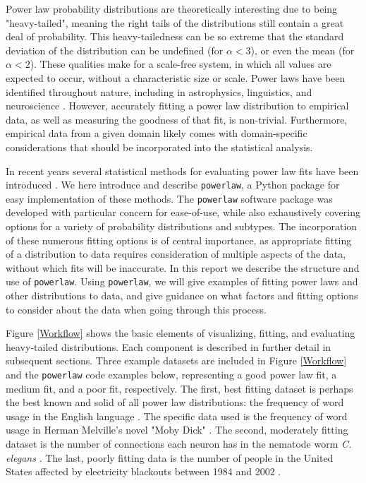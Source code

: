 \documentclass[10pt]{article}
\begin{document}
Power law probability distributions are theoretically interesting due to being  "heavy-tailed", meaning the right tails of the distributions still contain a great deal of probability. This heavy-tailedness can be so extreme that the standard deviation of the distribution can be undefined (for $\alpha<3$), or even the mean (for $\alpha<2$). These qualities make for a scale-free system, in which all values are expected to occur, without a characteristic size or scale. Power laws have been identified throughout nature, including in astrophysics, linguistics, and neuroscience \cite{Michel2011, Zipf1935, Beggs2003, Shriki2013}. However, accurately fitting a power law distribution to empirical data, as well as measuring the goodness of that fit, is non-trivial. Furthermore, empirical data from a given domain likely comes with domain-specific considerations that should be incorporated into the statistical analysis.

In recent years several statistical methods for evaluating power law fits have been introduced \cite{Clauset2009, Klaus2011}. We here introduce and describe \verb$powerlaw$, a Python package for easy implementation of these methods. The \verb$powerlaw$ software package was developed with particular concern for ease-of-use, while also exhaustively covering options for a variety of probability distributions and subtypes. The incorporation of these numerous fitting options is of central importance, as appropriate fitting of a distribution to data requires consideration of multiple aspects of the data, without which fits will be inaccurate. In this report we describe the structure and use of \verb$powerlaw$. Using \verb$powerlaw$, we will give examples of fitting power laws and other distributions to data, and give guidance on what factors and fitting options to consider about the data when going through this process.

Figure \ref{Workflow} shows the basic elements of visualizing, fitting, and evaluating heavy-tailed distributions. Each component is described in further detail in subsequent sections. Three example datasets are included in Figure \ref{Workflow} and the \verb$powerlaw$ code examples below, representing a good power law fit, a medium fit, and a poor fit, respectively. The first, best fitting dataset is perhaps the best known and solid of all power law distributions: the frequency of word usage in the English language \cite{Zipf1935}. The specific data used is the frequency of word usage in Herman Melville's novel "Moby Dick" \cite{Newman2005}. The second, moderately fitting dataset is the number of connections each neuron has in the nematode worm \textit{C. elegans} \cite{Towlson2013,Varshney2011}. The last, poorly fitting data is the number of people in the United States affected by electricity blackouts between 1984 and 2002 \cite{Newman2005}. 
\end{document}
